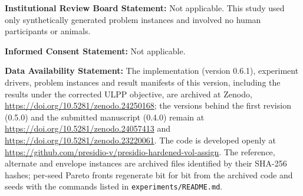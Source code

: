 \documentclass[systems,article,submit,moreauthors,pdftex]{Definitions/mdpi}
\providecommand{\dataavailability}[1]{\vspace{6pt}\noindent\textbf{Data Availability Statement:} #1\par}
\providecommand{\institutionalreview}[1]{\vspace{6pt}\noindent\textbf{Institutional Review Board Statement:} #1\par}
\providecommand{\informedconsent}[1]{\vspace{6pt}\noindent\textbf{Informed Consent Statement:} #1\par}
\begin{document}
\institutionalreview{Not applicable. This study used only synthetically generated problem instances and involved no human participants or animals.}

\informedconsent{Not applicable.}

\dataavailability{The implementation (version 0.6.1), experiment drivers, problem instances and result manifests of this version, including the results under the corrected ULPP objective, are archived at Zenodo, \url{https://doi.org/10.5281/zenodo.24250168}; the versions behind the first revision (0.5.0) and the submitted manuscript (0.4.0) remain at \url{https://doi.org/10.5281/zenodo.24057413} and \url{https://doi.org/10.5281/zenodo.23220061}. The code is developed openly at \url{https://github.com/presidio-v/presidio-hardened-vol-assign}. The reference, alternate and envelope instances are archived files identified by their SHA-256 hashes; per-seed Pareto fronts regenerate bit for bit from the archived code and seeds with the commands listed in \texttt{experiments/README.md}.}




\end{document}

